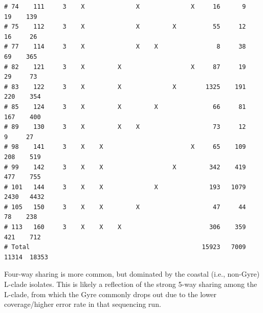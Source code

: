 \documentclass{article}\usepackage[]{graphicx}\usepackage[]{color}
\makeatletter
\newenvironment{kframe}{%
 \def\at@end@of@kframe{}%
 \ifinner\ifhmode%
  \def\at@end@of@kframe{\end{minipage}}%
  \begin{minipage}{\columnwidth}%
 \fi\fi%
 \def\FrameCommand##1{\hskip\@totalleftmargin \hskip-\fboxsep
 \colorbox{shadecolor}{##1}\hskip-\fboxsep
     \hskip-\linewidth \hskip-\@totalleftmargin \hskip\columnwidth}%
 \MakeFramed {\advance\hsize-\width
   \@totalleftmargin\z@ \linewidth\hsize
   \@setminipage}}%
 {\par\unskip\endMakeFramed%
 \at@end@of@kframe}
\newenvironment{knitrout}{}{} %
\makeatother
\begin{document}
\begin{knitrout}
\begin{kframe}
\begin{verbatim}
# 74    111     3    X              X              X     16      9     19    139
# 75    112     3    X              X         X          55     12     16     26
# 77    114     3    X              X    X                8     38     69    365
# 82    121     3    X         X                   X     87     19     29     73
# 83    122     3    X         X              X        1325    191    220    354
# 85    124     3    X         X         X               66     81    167    400
# 89    130     3    X         X    X                    73     12      9     27
# 98    141     3    X    X                        X     65    109    208    519
# 99    142     3    X    X                   X         342    419    477    755
# 101   144     3    X    X              X              193   1079   2430   4432
# 105   150     3    X    X         X                    47     44     78    238
# 113   160     3    X    X    X                        306    359    421    712
# Total                                               15923   7009  11314  18353
\end{verbatim}
\end{kframe}
\end{knitrout}

Four-way sharing is more common, but dominated by the coastal (i.e., non-Gyre) L-clade isolates.  This is likely a
reflection of the strong 5-way sharing among the L-clade, from which the Gyre commonly drops out due to the lower
coverage/higher error rate in that sequencing run.
\end{document}
